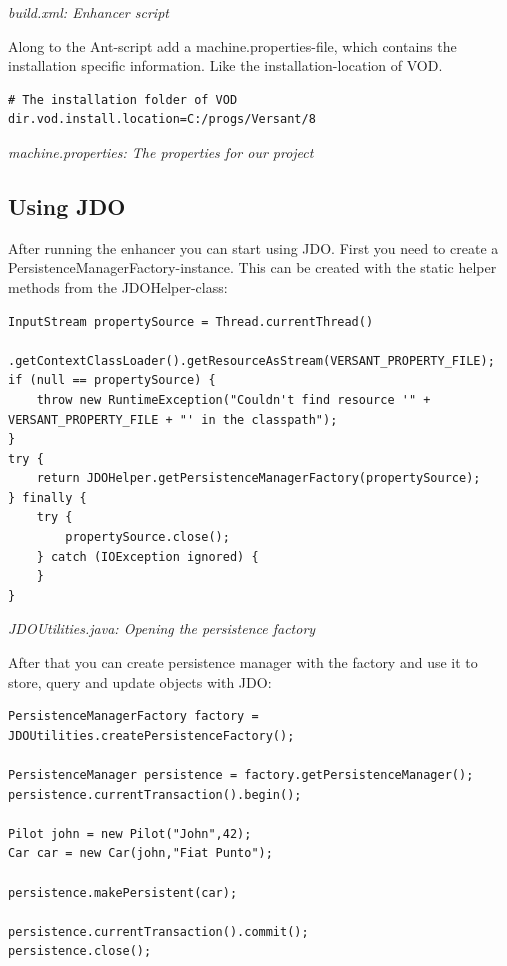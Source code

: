 {\small\itshape build.xml: Enhancer script\par}
\medskip

Along to the Ant-script add a machine.properties-file, which contains the installation specific information. Like the installation-location of VOD.

\begin{lstlisting}
# The installation folder of VOD
dir.vod.install.location=C:/progs/Versant/8
\end{lstlisting}

{\small\itshape machine.properties: The properties for our project\par}
\medskip

\subsection{Using JDO}
\label{drs:db4o-replication-system-drs-vod-setup:usingjdo}

After running the enhancer you can start using JDO. First you need to create a PersistenceManagerFactory-instance. This can be created with the static helper methods from the JDOHelper-class:

\begin{lstlisting}
InputStream propertySource = Thread.currentThread()
        .getContextClassLoader().getResourceAsStream(VERSANT_PROPERTY_FILE);
if (null == propertySource) {
    throw new RuntimeException("Couldn't find resource '" + VERSANT_PROPERTY_FILE + "' in the classpath");
}
try {
    return JDOHelper.getPersistenceManagerFactory(propertySource);
} finally {
    try {
        propertySource.close();
    } catch (IOException ignored) {
    }
}
\end{lstlisting}

{\small\itshape JDOUtilities.java: Opening the persistence factory\par}
\medskip

After that you can create persistence manager with the factory and use it to store, query and update objects with JDO:

\begin{lstlisting}
PersistenceManagerFactory factory = JDOUtilities.createPersistenceFactory();

PersistenceManager persistence = factory.getPersistenceManager();
persistence.currentTransaction().begin();

Pilot john = new Pilot("John",42);
Car car = new Car(john,"Fiat Punto");

persistence.makePersistent(car);

persistence.currentTransaction().commit();
persistence.close();
\end{lstlisting}

